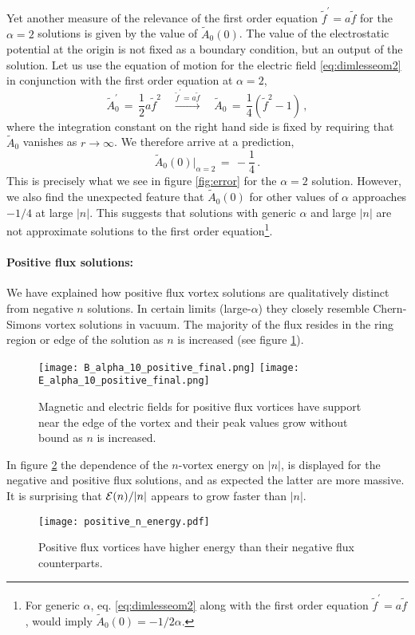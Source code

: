 \documentclass[12pt,a4paper]{article}
\def\be{\begin{equation}}
\def\ee{\end{equation}}
\begin{document}
Yet another measure of the relevance of the first order equation $\tilde f^\prime = a \tilde f$ for the $\alpha=2$ solutions is given by the value of $\tilde A_0(0)$. The value of the electrostatic potential at the origin is not fixed as a boundary condition, but an output of the solution. Let us use the equation of motion for the electric field \eqref{eq:dimlesseom2} in conjunction with the first order equation at $\alpha=2$,
\be
\tilde A_0^\prime\,=\,\frac{1}{2}a\tilde f^2 \quad\xrightarrow{\tilde f^\prime = a \tilde f}  \quad 
\tilde A_0\,=\,\frac{1}{4}\left(\tilde f^2-1\right)\,,
\ee
where the integration constant on the right hand side is fixed by requiring that $\tilde A_0$ vanishes as $r\to\infty$. 
We therefore arrive at a prediction,
\be
\tilde A_0(0)\big|_{\alpha=2}\,=\,-\frac{1}{4}\,.
\ee
This is precisely what we see in figure \ref{fig:error} for the $\alpha=2$ solution. However, we also find the unexpected feature that $\tilde A_0(0)$ for other values of $\alpha$ approaches $-1/4$ at large $|n|$. This suggests  that solutions with generic $\alpha$ and large $|n|$ are not approximate  solutions to the first order equation\footnote{For generic $\alpha$, eq. \eqref{eq:dimlesseom2} along with the first order equation $\tilde f^\prime = a \tilde f$, would imply $\tilde A_0(0)=-1/2\alpha$. }.
\paragraph{Positive flux solutions:}
We have explained how positive flux vortex solutions are qualitatively distinct from negative $n$ solutions. In certain limits (large-$\alpha$) they closely resemble  Chern-Simons vortex solutions in vacuum. 
The majority of the flux resides in the ring region or edge of the solution as $n$ is increased (see figure \ref{positiveprofile}).
\begin{figure}[h]
\begin{center}
 \texttt{[image: B\_alpha\_10\_positive\_final.png]} \texttt{[image: E\_alpha\_10\_positive\_final.png]}
     \caption{{Magnetic and electric fields for positive flux vortices have support near the edge of the vortex and their peak values grow without bound as $n$ is increased.}} \label{positiveprofile}
    \end{center}
\end{figure} 
In figure \ref{positiveenergy} the dependence of the $n$-vortex energy on $|n|$, is displayed for the negative and positive flux solutions, and as expected the latter are more massive.  It is surprising  that ${\cal E }(n)/|n|$ appears to grow faster than $|n|$.
\begin{figure}[h]
\begin{center}
 \texttt{[image: positive\_n\_energy.pdf]}
     \caption{{\small Positive flux vortices have higher energy than their negative flux counterparts.}} \label{positiveenergy}
    \end{center}
\end{figure}
\end{document}
